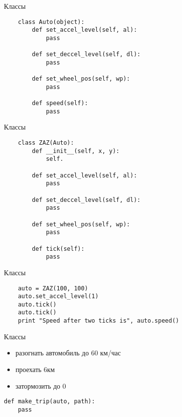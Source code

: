 \documentclass{article}
\begin{document}
\begin{center} Классы \end{center}
\begin{lstlisting}
    class Auto(object):
        def set_accel_level(self, al):
            pass

        def set_deccel_level(self, dl):
            pass

        def set_wheel_pos(self, wp):
            pass

        def speed(self):
            pass

\end{lstlisting}
\newpage

\begin{center} Классы \end{center}
\begin{lstlisting}
    class ZAZ(Auto):
        def __init__(self, x, y):
            self.

        def set_accel_level(self, al):
            pass

        def set_deccel_level(self, dl):
            pass

        def set_wheel_pos(self, wp):
            pass

        def tick(self):
            pass
\end{lstlisting}
\newpage

\begin{center} Классы \end{center}
\begin{lstlisting}
    auto = ZAZ(100, 100)
    auto.set_accel_level(1)
    auto.tick()
    auto.tick()
    print "Speed after two ticks is", auto.speed()
\end{lstlisting}
\newpage

\begin{center} Классы \end{center}
\begin{itemize}
    \item разогнать автомобиль до 60 км/час
    \item проехать 6км
    \item затормозить до 0
\end{itemize}

\begin{lstlisting}
def make_trip(auto, path):
    pass
\end{lstlisting}
\newpage

\end{document}
